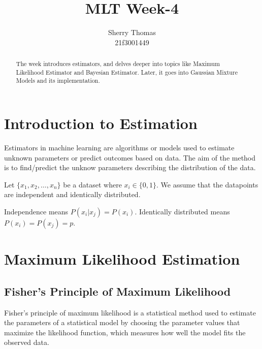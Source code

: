 \documentclass[
]{article}
\author{}
\date{}
\begin{document}
{
\setcounter{tocdepth}{3}
\tableofcontents
}
\title{MLT Week-4}
\author{Sherry Thomas \\ 21f3001449}

\maketitle
\tableofcontents

\begin{abstract}
The week introduces estimators, and delves deeper into topics like Maximum Likelihood Estimator and Bayesian Estimator. Later, it goes into Gaussian Mixture Models and its implementation.
\end{abstract}

\hypertarget{introduction-to-estimation}{%
\section{Introduction to Estimation}\label{introduction-to-estimation}}

Estimators in machine learning are algorithms or models used to estimate
unknown parameters or predict outcomes based on data. The aim of the
method is to find/predict the unknow parameters describing the
distribution of the data.

Let \(\{x_1, x_2, \ldots, x_n\}\) be a dataset where
\(x_i \in \{0,1\}\). We assume that the datapoints are independent and
identically distributed.

Independence means \(P(x_i|x_j) = P(x_i)\). Identically distributed
means \(P(x_i)=P(x_j)=p\).

\hypertarget{maximum-likelihood-estimation}{%
\section{Maximum Likelihood
Estimation}\label{maximum-likelihood-estimation}}

\hypertarget{fishers-principle-of-maximum-likelihood}{%
\subsection{Fisher's Principle of Maximum
Likelihood}\label{fishers-principle-of-maximum-likelihood}}

Fisher's principle of maximum likelihood is a statistical method used to
estimate the parameters of a statistical model by choosing the parameter
values that maximize the likelihood function, which measures how well
the model fits the observed data.
\end{document}
